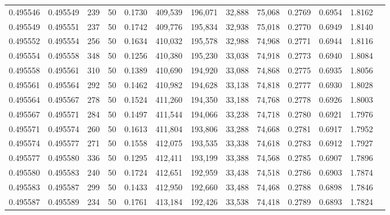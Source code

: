 \begin{tabular}{rrrrrrrrrrrrr}
0.495546 & 0.495549 &   239 &  50 &                                     0.1730 & 409,539 & 196,071 &  32,888 &  75,068 & 0.2769 & 0.6954 & 1.8162 \\
0.495549 & 0.495551 &   237 &  50 &                                     0.1742 & 409,776 & 195,834 &  32,938 &  75,018 & 0.2770 & 0.6949 & 1.8140 \\
0.495552 & 0.495554 &   256 &  50 &                                     0.1634 & 410,032 & 195,578 &  32,988 &  74,968 & 0.2771 & 0.6944 & 1.8116 \\
0.495554 & 0.495558 &   348 &  50 &                                     0.1256 & 410,380 & 195,230 &  33,038 &  74,918 & 0.2773 & 0.6940 & 1.8084 \\
0.495558 & 0.495561 &   310 &  50 &                                     0.1389 & 410,690 & 194,920 &  33,088 &  74,868 & 0.2775 & 0.6935 & 1.8056 \\
0.495561 & 0.495564 &   292 &  50 &                                     0.1462 & 410,982 & 194,628 &  33,138 &  74,818 & 0.2777 & 0.6930 & 1.8028 \\
0.495564 & 0.495567 &   278 &  50 &                                     0.1524 & 411,260 & 194,350 &  33,188 &  74,768 & 0.2778 & 0.6926 & 1.8003 \\
0.495567 & 0.495571 &   284 &  50 &                                     0.1497 & 411,544 & 194,066 &  33,238 &  74,718 & 0.2780 & 0.6921 & 1.7976 \\
0.495571 & 0.495574 &   260 &  50 &                                     0.1613 & 411,804 & 193,806 &  33,288 &  74,668 & 0.2781 & 0.6917 & 1.7952 \\
0.495574 & 0.495577 &   271 &  50 &                                     0.1558 & 412,075 & 193,535 &  33,338 &  74,618 & 0.2783 & 0.6912 & 1.7927 \\
0.495577 & 0.495580 &   336 &  50 &                                     0.1295 & 412,411 & 193,199 &  33,388 &  74,568 & 0.2785 & 0.6907 & 1.7896 \\
0.495580 & 0.495583 &   240 &  50 &                                     0.1724 & 412,651 & 192,959 &  33,438 &  74,518 & 0.2786 & 0.6903 & 1.7874 \\
0.495583 & 0.495587 &   299 &  50 &                                     0.1433 & 412,950 & 192,660 &  33,488 &  74,468 & 0.2788 & 0.6898 & 1.7846 \\
0.495587 & 0.495589 &   234 &  50 &                                     0.1761 & 413,184 & 192,426 &  33,538 &  74,418 & 0.2789 & 0.6893 & 1.7824 \\

\end{tabular}
